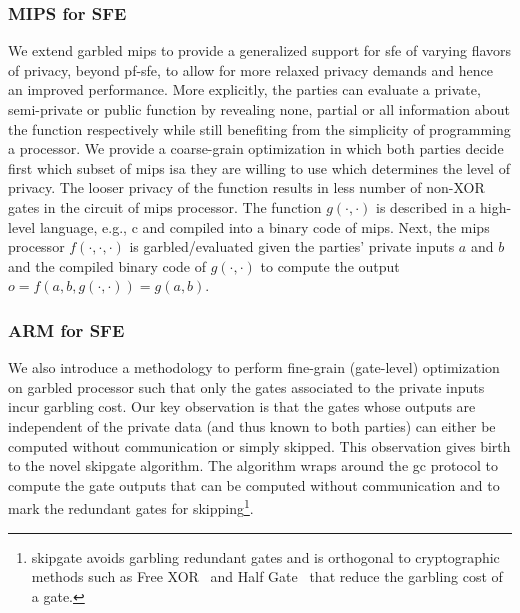 \subsubsection{MIPS for SFE}
We extend garbled \gls{mips} to provide a generalized support for \acrshort{sfe} of varying flavors of privacy, beyond \acrshort{pf-sfe}, to allow for more relaxed privacy demands and hence an improved performance.
More explicitly, the parties can evaluate a private, semi-private or public function by revealing none, partial or all information about the function respectively while still benefiting from the simplicity of programming a processor.
We provide a coarse-grain optimization in which both parties decide first which subset of \gls{mips} \acrfull{isa} they are willing to use which determines the level of privacy.
The looser privacy of the function results in less number of non-XOR gates in the circuit of \gls{mips} processor.
The function $g(\cdot,\cdot)$ is described in a high-level language, e.g., \gls{c} and compiled into a binary code of \acrshort{mips}.
Next, the \gls{mips} processor $f(\cdot, \cdot, \cdot)$ is garbled/evaluated given the parties' private inputs $a$ and $b$ and the compiled binary code of $g(\cdot,\cdot)$ to compute the output $o = f(a, b, g(\cdot,\cdot)) = g(a,b)$.

\subsubsection{ARM for SFE}
We also introduce a methodology to perform fine-grain (gate-level) optimization on garbled processor such that only the gates associated to the private inputs incur garbling cost.
Our key observation is that the gates whose outputs are independent of the private data (and thus known to both parties) can either be computed without communication or simply skipped.
This observation gives birth to the novel \gls{skipgate} algorithm.
The algorithm wraps around the \acrshort{gc} protocol to compute the gate outputs that can be computed without communication and to mark the redundant gates for skipping\footnote{\gls{skipgate} avoids garbling redundant gates and is orthogonal to cryptographic methods such as Free XOR~\cite{kolesnikov2008improved} and Half Gate~\cite{zahur2015two} that reduce the garbling cost of a gate.}.

